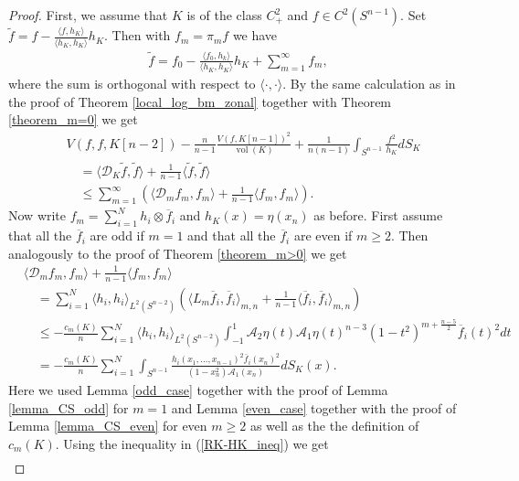 \documentclass[12pt,twoside]{amsart}
\numberwithin{satz}{section}
\theoremstyle{definition}
\numberwithin{equation}{section}
\newcommand\vol{\operatorname{vol}}
\begin{document}
	\begin{proof}
		First, we assume that $K$ is of the class $C_+^2$ and $f\in C^2(S^{n-1})$. Set $\tilde{f}=f-\frac{\langle f,h_K\rangle}{\langle h_K,h_K\rangle}h_K$. Then with $f_m=\pi_mf$ we have
		\begin{align*}
			\tilde{f}=f_0-\frac{\langle f_0,h_k\rangle}{\langle h_K,h_K\rangle}h_K+\sum_{m=1}^\infty f_m,
		\end{align*}
		where the sum is orthogonal with respect to $\langle\cdot,\cdot\rangle$. By the same calculation as in the proof of Theorem \ref{local_log_bm_zonal} together with Theorem \ref{theorem_m=0} we get
		\begin{align*}
			&V(f,f,K[n-2])-\frac{n}{n-1}\frac{V(f,K[n-1])^2}{\vol(K)}+\frac{1}{ n(n-1)}\int_{S^{n-1}}\frac{f^2}{h_K}dS_K \\
			& \quad = \langle \mathcal{D}_K\tilde{f},\tilde{f}\rangle + \frac{1}{n-1}\langle \tilde{f},\tilde{f}\rangle \\
			& \quad \leq \sum_{m=1}^\infty \left(\langle \mathcal{D}_mf_m,f_m\rangle + \frac{1}{n-1}\langle f_m,f_m\rangle\right).
		\end{align*}
		Now write $f_m=\sum_{i=1}^Nh_i\otimes \overline{f}_i$ and $h_K(x)=\eta(x_n)$ as before. First assume that all the $\overline{f}_i$ are odd if $m=1$ and that all the $\overline{f}_i$ are even if $m\geq 2$. Then analogously to the proof of Theorem \ref{theorem_m>0} we get
		\begin{align*}
			&\langle \mathcal{D}_mf_m,f_m\rangle + \frac{1}{n-1}\langle f_m,f_m\rangle \\
			& \quad = \sum_{i=1}^N \langle h_i,h_i\rangle_{L^2(S^{n-2})} \left(\langle L_m\overline{f}_i,\overline{f}_i\rangle_{m,n}+\frac{1}{n-1}\langle\overline{f}_i,\overline{f}_i\rangle_{m,n}\right) \\
			& \quad \leq  -\frac{c_m(K)}{n}\sum_{i=1}^N \langle h_i,h_i\rangle_{L^2(S^{n-2})}\int_{-1}^1 \mathcal{A}_2\eta(t)\mathcal{A}_1\eta(t)^{n-3}(1-t^2)^{m+\frac{n-5}{2}}\overline{f}_i(t)^2dt \\
			& \quad = -\frac{c_m(K)}{n}\sum_{i=1}^N \int_{S^{n-1}} \frac{h_i(x_1,\dots,x_{n-1})^2\overline{f}_i(x_n)^2}{(1-x_n^2)\mathcal{A}_1(x_n)}dS_K(x).
		\end{align*}
		Here we used Lemma \ref{odd_case} together with the proof of Lemma \ref{lemma_CS_odd} for $m=1$ and Lemma \ref{even_case} together with the proof of Lemma \ref{lemma_CS_even} for even $m\geq 2$ as well as the the definition of $c_m(K)$. Using the inequality in (\ref{RK-HK_ineq}) we get
		\begin{align}\label{stronger_ev_ineq}

\end{align}
\end{proof}
\end{document}
